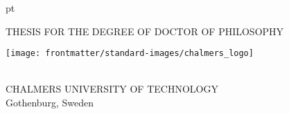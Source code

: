 {
 pt
\centering
\thispagestyle{empty}         %


\begin{normalsize}{\uppercase{Thesis for the degree of Doctor of Philosophy}}
\end{normalsize}


\vspace{3 cm}

{\large \textbf{\thesistitle} \par}
\vskip 1pc
{\large \thesissubtitle}
\vspace{1.5 cm}
\vspace{-10pt}

{\normalsize \MakeUppercase{\thesisauthor} \par}

\vspace{5 cm}

\texttt{[image: frontmatter/standard-images/chalmers\_logo]}
\vfill
\vspace{0.5 cm}

\thesisdepartment \\
{\scshape CHALMERS UNIVERSITY OF TECHNOLOGY} \\
Gothenburg, Sweden \thesisyear

\newpage
}
